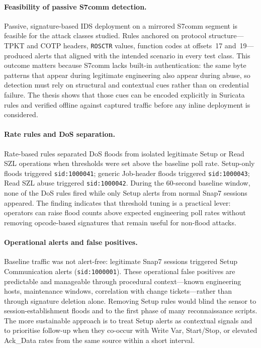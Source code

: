 \documentclass[../main.tex]{subfiles}
\begin{document}
\paragraph{Feasibility of passive S7comm detection.}
Passive, signature-based IDS deployment on a mirrored S7comm segment is feasible for the attack classes studied. Rules anchored on protocol structure---TPKT and COTP headers, \texttt{ROSCTR} values, function codes at offsets~17 and~19---produced alerts that aligned with the intended scenario in every test class. This outcome matters because S7comm lacks built-in authentication: the same byte patterns that appear during legitimate engineering also appear during abuse, so detection must rely on structural and contextual cues rather than on credential failure. The thesis shows that those cues can be encoded explicitly in Suricata rules and verified offline against captured traffic before any inline deployment is considered.

\paragraph{Rate rules and DoS separation.}
Rate-based rules separated DoS floods from isolated legitimate Setup or Read SZL operations when thresholds were set above the baseline poll rate. Setup-only floods triggered \texttt{sid:1000041}; generic Job-header floods triggered \texttt{sid:1000043}; Read SZL abuse triggered \texttt{sid:1000042}. During the 60-second baseline window, none of the DoS rules fired while only Setup alerts from normal Snap7 sessions appeared. The finding indicates that threshold tuning is a practical lever: operators can raise flood counts above expected engineering poll rates without removing opcode-based signatures that remain useful for non-flood attacks.

\paragraph{Operational alerts and false positives.}
Baseline traffic was not alert-free: legitimate Snap7 sessions triggered Setup Communication alerts (\texttt{sid:1000001}). These operational false positives are predictable and manageable through procedural context---known engineering hosts, maintenance windows, correlation with change tickets---rather than through signature deletion alone. Removing Setup rules would blind the sensor to session-establishment floods and to the first phase of many reconnaissance scripts. The more sustainable approach is to treat Setup alerts as contextual signals and to prioritise follow-up when they co-occur with Write Var, Start/Stop, or elevated Ack\_Data rates from the same source within a short interval.
\end{document}
